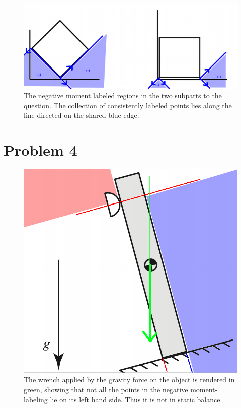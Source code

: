 \documentclass[letterpaper,10pt]{article} %
\begin{document}
\begin{figure}[h]
\centering
\includegraphics[width=\textwidth]{p3minus}
\caption{The negative moment labeled regions in the two subparts to the question. The collection of consistently labeled points lies along the line directed on the shared blue edge.}
\label{fig:p3b}
\end{figure}

\newpage

\section*{Problem 4}

\begin{figure}[h]
\centering
\includegraphics[width=\textwidth]{p4a}
\caption{The wrench applied by the gravity force on the object is rendered in green, showing that not all the points in the negative moment-labeling lie on its left hand side. Thus it is not in static balance.}
\label{fig:p4a}
\end{figure}
\end{document}
